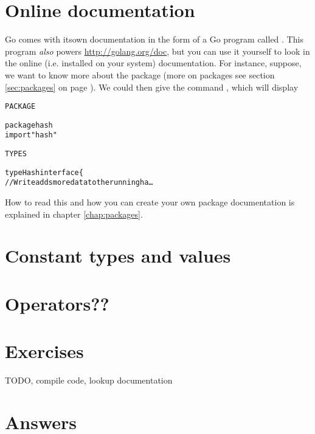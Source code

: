\section{Online documentation}
Go comes with itsown  documentation in the form of a Go program called
. This program \emph{also} powers
\url{http://golang.org/doc}, but you can use it yourself to look
in the online (i.e. installed on your system) documentation. For
instance, suppose, we want to know more about the package  
(more on packages see section \ref{sec:packages} on page
\pageref{sec:packages}). We could then give the command
, which will display
\begin{alltt}
PACKAGE

package hash
import "hash"

TYPES

type Hash interface \{
    // Write adds more data to the running ha \ldots
\end{alltt}
How to read this and how you can create your own package documentation
is explained in chapter \ref{chap:packages}.

\section{Constant types and values} %

\section{Operators??}



\section{Exercises}


TODO, compile code, lookup documentation

\cleardoublepage
\section{Answers}
\shipoutAnswer
